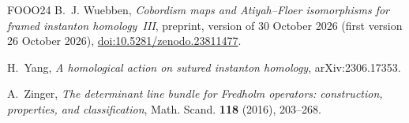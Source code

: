 \documentclass[11pt]{amsart}
\theoremstyle{definition}
\theoremstyle{remark}
\theoremstyle{plain}
\numberwithin{equation}{section}
\begin{document}
\begin{thebibliography}{FOOO24}
B.~J. Wuebben, \emph{Cobordism maps and Atiyah--Floer isomorphisms
for framed instanton homology~III}, preprint, version of 30 October 2026
(first version 26 October 2026),
\href{https://doi.org/10.5281/zenodo.23811477}{doi:10.5281/zenodo.23811477}.

H.~Yang, \emph{A homological action on sutured instanton homology},
arXiv:2306.17353.

A.~Zinger, \emph{The determinant line bundle for Fredholm operators:
construction, properties, and classification},
Math. Scand. \textbf{118} (2016), 203--268.

\end{thebibliography}
\end{document}
